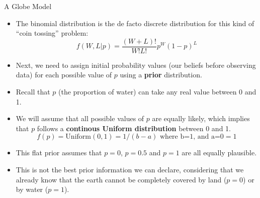 \documentclass[handout]{beamer}
\begin{document}
\begin{frame}{A Globe Model}
\scriptsize{

\begin{itemize}
\item The binomial distribution is the de facto discrete distribution for this kind of ``coin tossing'' problem:
\begin{displaymath}
 f(W,L|p) = \frac{(W+L)!}{W!L!}p^W(1-p)^L
\end{displaymath}
\item Next, we need to assign initial probability values (our beliefs before observing data) for each possible value of $p$ using a \textbf{prior} distribution.
\item Recall that $p$ (the proportion of water) can take any real value between 0 and 1.
\item We will assume that all possible values of $p$ are equally likely, which implies that $p$ follows a \textbf{continous Uniform distribution} between 0 and 1.
\begin{displaymath}
 f(p) = \text{Uniform}(0,1) = 1/(b-a) \text{ where b=1, and a=0} = 1
\end{displaymath}

\item This flat prior assumes that $p=0$, $p=0.5$ and $p=1$ are all equally plausible.
\item This is not the best prior information we can declare, considering that we already know that the earth cannot be completely covered by land ($p=0$) or by water ($p=1$).

\end{itemize}

} 


\end{frame}
\end{document}
